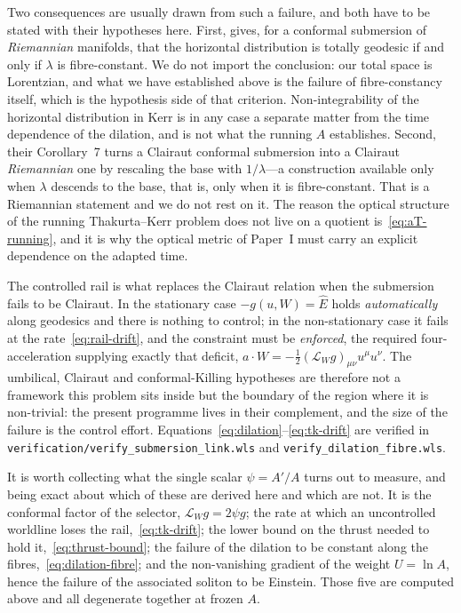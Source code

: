 \documentclass[12pt]{iopart}
\theoremstyle{plain}
\theoremstyle{definition}
\theoremstyle{remark}
\newcommand{\Ehat}{\hat E}
\begin{document}
Two consequences are usually drawn from such a failure, and both have to be stated
with their hypotheses here. First, \cite[Prop.~1]{MeenaZawadzki2024} gives, for a
conformal submersion of \emph{Riemannian} manifolds, that the horizontal
distribution is totally geodesic if and only if $\lambda$ is fibre-constant. We do
not import the conclusion: our total space is Lorentzian, and what we have
established above is the failure of fibre-constancy itself, which is the hypothesis
side of that criterion. Non-integrability of the horizontal distribution in Kerr is
in any case a separate matter from the time dependence of the dilation, and is not
what the running $A$ establishes. Second,
their Corollary~7 turns a Clairaut conformal submersion into a Clairaut
\emph{Riemannian} one by rescaling the base with $1/\lambda$---a construction
available only when $\lambda$ descends to the base, that is, only when it is
fibre-constant. That is a Riemannian statement and we do not rest on it. The reason the
optical structure of the running Thakurta--Kerr problem does not live on a quotient
is~\eqref{eq:aT-running}, and it is why the optical metric of Paper~I must carry an
explicit dependence on the adapted time.

The controlled rail is what replaces the Clairaut relation when the submersion
fails to be Clairaut. In the stationary case $-g(u,W)=\Ehat$ holds
\emph{automatically} along geodesics and there is nothing to control; in the
non-stationary case it fails at the rate~\eqref{eq:rail-drift}, and the
constraint must be \emph{enforced}, the required four-acceleration supplying
exactly that deficit, $a\cdot W=-\tfrac12(\mathcal L_Wg)_{\mu\nu}u^\mu u^\nu$. The
umbilical, Clairaut and conformal-Killing hypotheses are therefore not a
framework this problem sits inside but the boundary of the region where it is
non-trivial: the present programme lives in their complement, and the size of the
failure is the control effort. Equations~\eqref{eq:dilation}--\eqref{eq:tk-drift}
are verified in \texttt{verification/verify\_submersion\_link.wls} and
\texttt{verify\_dilation\_fibre.wls}.

It is worth collecting what the single scalar $\psi=A'/A$ turns out to measure,
and being exact about which of these are derived here and which are not. It is
the conformal factor of the selector, $\mathcal L_Wg=2\psi g$; the rate at which
an uncontrolled worldline loses the rail,~\eqref{eq:tk-drift}; the lower bound on
the thrust needed to hold it,~\eqref{eq:thrust-bound}; the failure of the
dilation to be constant along the fibres,~\eqref{eq:dilation-fibre}; and the
non-vanishing gradient of the weight $U=\ln A$, hence the failure of the associated soliton
to be Einstein. Those five are computed above and all degenerate together at
frozen $A$.
\end{document}
